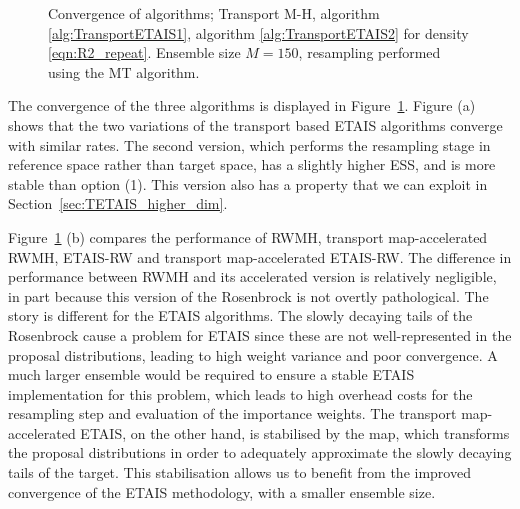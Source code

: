 \documentclass[final]{siamltex}
\begin{document}
\begin{figure}[!ht]
\centering
{}
\caption{Convergence of algorithms; Transport M-H,
  algorithm \ref{alg:TransportETAIS1}, algorithm \ref{alg:TransportETAIS2} for
  density \eqref{eqn:R2_repeat}. Ensemble size $M=150$, resampling performed using the MT algorithm.}
\label{fig:R2_l2_convergence}
\end{figure}

The convergence of the three algorithms is displayed in
Figure~\ref{fig:R2_l2_convergence}. Figure (a) shows that the two
variations of the transport based ETAIS algorithms converge with
similar rates. The second version, which performs the resampling stage
in reference space rather than target space, has a slightly higher
ESS, and is more stable than option (1). This version also has a
property that we can exploit in Section~\ref{sec:TETAIS_higher_dim}.

Figure~\ref{fig:R2_l2_convergence} (b) compares the performance of
RWMH, transport map-accelerated RWMH, ETAIS-RW and transport
map-accelerated ETAIS-RW. The difference in performance between RWMH
and its accelerated version is relatively negligible, in part because
this version of the Rosenbrock is not overtly pathological. The story
is different for the ETAIS algorithms. The slowly decaying tails of
the Rosenbrock cause a problem for ETAIS since these are not
well-represented in the proposal distributions, leading to high weight
variance and poor convergence. A much larger
ensemble would be required to ensure a stable ETAIS implementation for this
problem, which leads to high overhead costs for the resampling step
and evaluation of the importance weights. The transport map-accelerated
ETAIS, on the other hand, is stabilised by the map, which transforms the proposal
distributions in order to adequately approximate the slowly decaying
tails of the target. This stabilisation allows us to benefit from the
improved convergence of the ETAIS methodology, with a smaller ensemble
size. 
\end{document}
